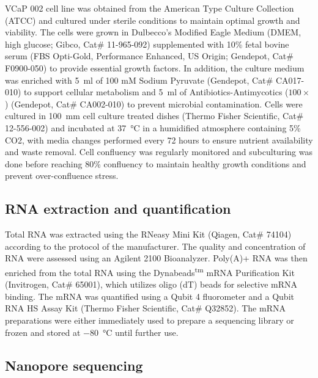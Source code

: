 \documentclass[pdflatex, sn-mathphys-num, lineno]{sn-jnl}%
\theoremstyle{thmstyleone}%
\theoremstyle{thmstyletwo}%
\theoremstyle{thmstylethree}%
\begin{document}
VCaP 002 cell line was obtained from the American Type Culture Collection (ATCC) and cultured under sterile conditions to maintain optimal growth and viability.
The cells were grown in Dulbecco's Modified Eagle Medium (DMEM, high glucose; Gibco, Cat\# 11-965-092) supplemented with 10\% fetal bovine serum (FBS Opti-Gold, Performance Enhanced, US Origin; Gendepot, Cat\# F0900-050) to provide essential growth factors.
In addition, the culture medium was enriched with \SI{5}{\ml} of 100 mM Sodium Pyruvate (Gendepot, Cat\# CA017-010) to support cellular metabolism and \SI{5}{\ml} of Antibiotics-Antimycotics (\( 100\times \)) (Gendepot, Cat\# CA002-010) to prevent microbial contamination.
Cells were cultured in \SI{100}{\mm} cell culture treated dishes (Thermo Fisher Scientific, Cat\# 12-556-002) and incubated at \SI{37}{\degreeCelsius} in a humidified atmosphere containing 5\% CO2, with media changes performed every 72 hours to ensure nutrient availability and waste removal.
Cell confluency was regularly monitored and subculturing was done before reaching 80\% confluency to maintain healthy growth conditions and prevent over-confluence stress.

\subsection{RNA extraction and quantification}

Total RNA was extracted using the RNeasy Mini Kit (Qiagen, Cat\# 74104) according to the protocol of the manufacturer.
The quality and concentration of RNA were assessed using an Agilent 2100 Bioanalyzer.
Poly(A)+ RNA was then enriched from the total RNA using the Dynabeads\textsuperscript{tm} mRNA Purification Kit (Invitrogen, Cat\# 65001), which utilizes oligo (dT) beads for selective mRNA binding.
The mRNA was quantified using a Qubit 4 fluorometer and a Qubit RNA HS Assay Kit (Thermo Fisher Scientific, Cat\# Q32852).
The mRNA preparations were either immediately used to prepare a sequencing library or frozen and stored at \SI{-80}{\degreeCelsius} until further use.

\subsection{Nanopore sequencing}
\end{document}
